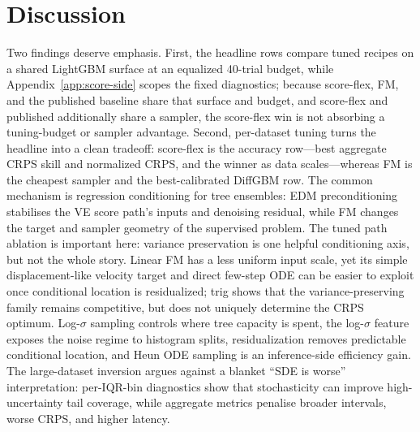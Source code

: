 \documentclass{article}
\begin{document}
\section{Discussion}\label{sec:disc}
Two findings deserve emphasis. First, the headline rows compare tuned recipes on a shared LightGBM surface at an equalized 40-trial budget, while Appendix~\ref{app:score-side} scopes the fixed diagnostics; because score-flex, FM, and the published baseline share that surface and budget, and score-flex and published additionally share a sampler, the score-flex win is not absorbing a tuning-budget or sampler advantage. Second, per-dataset tuning turns the headline into a clean tradeoff: score-flex is the accuracy row---best aggregate CRPS skill and normalized CRPS, and the winner as data scales---whereas FM is the cheapest sampler and the best-calibrated DiffGBM row. The common mechanism is regression conditioning for tree ensembles: EDM preconditioning stabilises the VE score path's inputs and denoising residual, while FM changes the target and sampler geometry of the supervised problem. The tuned path ablation is important here: variance preservation is one helpful conditioning axis, but not the whole story. Linear FM has a less uniform input scale, yet its simple displacement-like velocity target and direct few-step ODE can be easier to exploit once conditional location is residualized; trig shows that the variance-preserving family remains competitive, but does not uniquely determine the CRPS optimum. Log-$\sigma$ sampling controls where tree capacity is spent, the log-$\sigma$ feature exposes the noise regime to histogram splits, residualization removes predictable conditional location, and Heun ODE sampling is an inference-side efficiency gain. The large-dataset inversion argues against a blanket ``SDE is worse'' interpretation: per-IQR-bin diagnostics show that stochasticity can improve high-uncertainty tail coverage, while aggregate metrics penalise broader intervals, worse CRPS, and higher latency.
\end{document}
